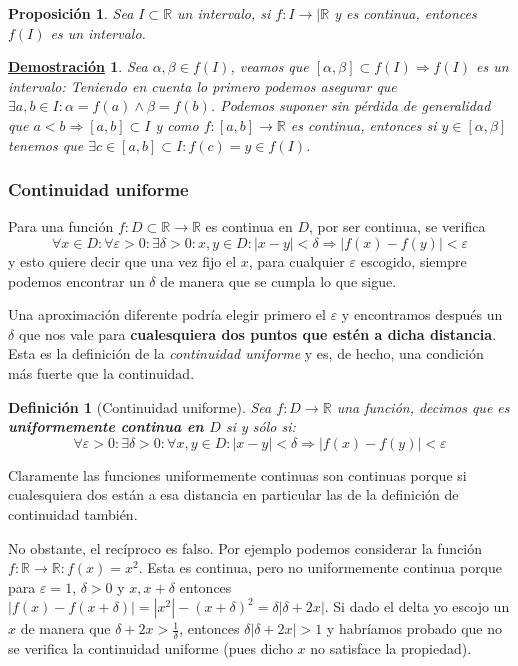 \documentclass[10pt,a4paper,openright]{book}
\theoremstyle{break}
\newtheorem{defi}{Definición}[chapter]
\newtheorem{prop}{Proposición}[chapter]
\newtheorem*{demo}{\underline{Demostración}}
\begin{document}
\begin{prop}
Sea $I\subset \mathbb R$ un intervalo, si $f: I\rightarrow |\mathbb R$ y es continua, entonces $f(I)$ es un intervalo.
\end{prop}
\begin{demo}
Sea $\alpha, \beta\in f(I)$, veamos que $[\alpha, \beta]\subset f(I)\Rightarrow f(I)$ es un intervalo:
Teniendo en cuenta lo primero podemos asegurar que $\exists a, b \in I: \alpha=f(a) \wedge \beta=f(b)$. Podemos suponer sin pérdida de generalidad que $a<b\Rightarrow [a,b]\subset I$ y como $f:[a,b]\rightarrow \mathbb R$ es continua, entonces si $y \in [\alpha,\beta]$ tenemos que $\exists c\in [a,b]\subset I: f(c)=y\in f(I)$.
\end{demo}

\subsubsection{Continuidad uniforme}
Para una función $f: D\subset\mathbb R\rightarrow \mathbb R$ es continua en $D$, por ser continua, se verifica
\[
\forall x\in D: \forall \varepsilon>0: \exists \delta>0 : x,y \in D: |x-y|<\delta\Rightarrow |f(x)-f(y)|<\varepsilon
\]
y esto quiere decir que una vez fijo el $x$, para cualquier $\varepsilon$ escogido, siempre podemos encontrar un $\delta$ de manera que se cumpla lo que sigue.

Una aproximación diferente podría elegir primero el $\varepsilon$ y encontramos después un $\delta$ que nos vale para \textbf{cualesquiera dos puntos que estén a dicha distancia}. Esta es la definición de la \textit{continuidad uniforme} y es, de hecho, una condición más fuerte que la continuidad.

\begin{defi}[Continuidad uniforme]
Sea $f:D\rightarrow \mathbb{R}$ una función, decimos que es \textbf{uniformemente continua en $D$} si y sólo si:
$$\forall \varepsilon>0: \exists \delta>0 : \forall x, y \in D: |x-y|<\delta \Rightarrow |f(x)-f(y)|<\varepsilon$$
\end{defi}

Claramente las funciones uniformemente continuas son continuas porque si cualesquiera dos están a esa distancia en particular las de la definición de continuidad también.

No obstante, el recíproco es falso. Por ejemplo podemos considerar la función $f: \mathbb R \rightarrow \mathbb R: f(x)=x^2$. Esta es continua, pero no uniformemente continua porque para $\varepsilon=1$, $\delta >0$ y $x,x+\delta$ entonces $|f(x)-f(x+\delta)|=|x^2|-(x+\delta)^2=\delta|\delta +2x|$. Si dado el delta yo escojo un $x$ de manera que $\delta +2x > \frac{1}{\delta}$, entonces $\delta|\delta +2x|>1$ y habríamos probado que no se verifica la continuidad uniforme (pues dicho $x$ no satisface la propiedad).
\end{document}
